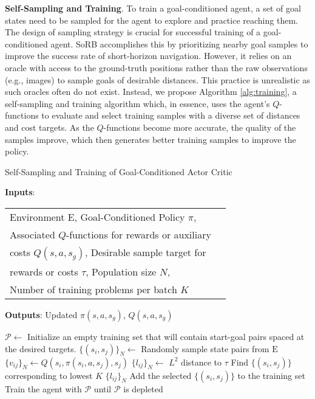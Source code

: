 \documentclass[letterpaper, 10 pt, conference]{IEEEConference}
\begin{document}
\textbf{Self-Sampling and Training}. To train a goal-conditioned agent, a set of goal states need to be sampled for the agent to explore and practice reaching them. The design of sampling strategy is crucial for successful training of a goal-conditioned agent. SoRB \cite{eysenbach2019search} accomplishes this by prioritizing nearby goal samples to improve the success rate of short-horizon navigation. However, it relies on an oracle with access to the ground-truth positions rather than the raw observations (e.g., images) to sample goals of desirable distances. This practice is unrealistic as such oracles often do not exist. Instead, we propose Algorithm \ref{alg:training}, a self-sampling and training algorithm which, in essence, uses the agent's $Q$-functions to evaluate and select training samples with a diverse set of distances and cost targets. As the $Q$-functions become more accurate, the quality of the samples improve, which then generates better training samples to improve the policy.
\begin{algorithm}
    \caption{Self-Sampling and Training of Goal-Conditioned Actor Critic}
    \label{alg:training}
    \textbf{Inputs}: 
    \begin{tabular}[t]{ll}
        Environment $\mathrm{E}$, Goal-Conditioned Policy $\pi$, \\
        Associated $Q$-functions for rewards or auxiliary \\ 
        costs $Q(s, a, s_g)$, Desirable sample target for \\ 
        rewards or costs $\tau$, Population size $N$, \\
        Number of training problems per batch $K$
    \end{tabular}
    \textbf{Outputs}: Updated $\pi(s,a,s_g)$, $Q(s, a, s_g)$
    \begin{algorithmic}[1]
    \State $\mathcal{P} \gets$ Initialize an empty training set that will contain start-goal pairs spaced at the desired targets.
        \State $\{(s_i,s_j)\}_N \gets$ Randomly sample state pairs from $\mathrm{E}$
        \State $\{v_{ij}\}_N \gets Q(s_i, \pi(s_i, a, s_j), s_j)$
        \State $\{l_{ij}\}_N \gets $ $L^2$ distance to $\tau$
        \State Find $\{(s_i,s_j)\}$ corresponding to lowest $K$  $\{l_{ij}\}_N$
        \State Add the selected $\{(s_i,s_j)\}$ to the training set
        \State Train the agent with $\mathcal{P}$ until $\mathcal{P}$ is depleted
    \EndFor
    \end{algorithmic}
\end{algorithm}
\end{document}
